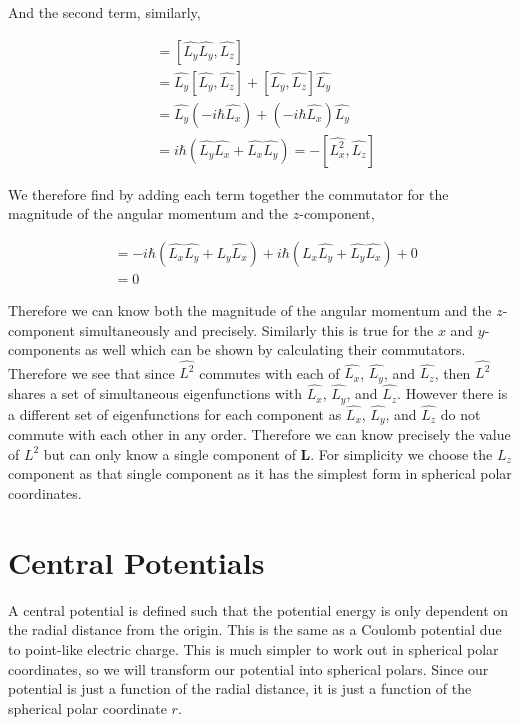 \documentclass[11pt]{amsart}
\begin{document}
And the second term, similarly,

\begin{align*}
  [\hat{L_y^2}, \hat{L_z}] &= [\hat{L_y}\hat{L_y}, \hat{L_z}] \\
                           &= \hat{L_y}[\hat{L_y}, \hat{L_z}] + [\hat{L_y}, \hat{L_z}]\hat{L_y} \\
                           &= \hat{L_y}(-i\hbar\hat{L_x}) + (-i\hbar\hat{L_x})\hat{L_y} \\
                           &= i\hbar(\hat{L_y}\hat{L_x} + \hat{L_x}\hat{L_y}) = -[\hat{L_x^2}, \hat{L_z}]
\end{align*}

We therefore find by adding each term together the commutator for the magnitude of the angular momentum and the $z$-component,

\begin{align*}
  [\hat{L^2}, \hat{L_z^2}] &= -i\hbar(\hat{L_x}\hat{L_y}+\hat{L_y}\hat{L_x}) + i\hbar(\hat{L_x}\hat{L_y}+\hat{L_y}\hat{L_x}) + 0 \\
                           &= 0
\end{align*}

Therefore we can know both the magnitude of the angular momentum and the $z$-component simultaneously and precisely. Similarly this is true for the $x$ and $y$-components as well which can be shown by calculating their commutators. Therefore we see that since $\hat{L^2}$ commutes with each of $\hat{L_x}$, $\hat{L_y}$, and $\hat{L_z}$, then $\hat{L^2}$ shares a set of simultaneous eigenfunctions with $\hat{L_x}$, $\hat{L_y}$, and $\hat{L_z}$. However there is a different set of eigenfunctions for each component as $\hat{L_x}$, $\hat{L_y}$, and $\hat{L_z}$ do not commute with each other in any order. Therefore we can know precisely the value of $L^2$ but can only know a single component of $\mathbf{L}$. For simplicity we choose the $L_z$ component as that single component as it has the simplest form in spherical polar coordinates.


\section{Central Potentials}

A central potential is defined such that the potential energy is only dependent on the radial distance from the origin. This is the same as a Coulomb potential due to point-like electric charge. This is much simpler to work out in spherical polar coordinates, so we will transform our potential into spherical polars. Since our potential is just a function of the radial distance, it is just a function of the spherical polar coordinate $r$.
\end{document}
